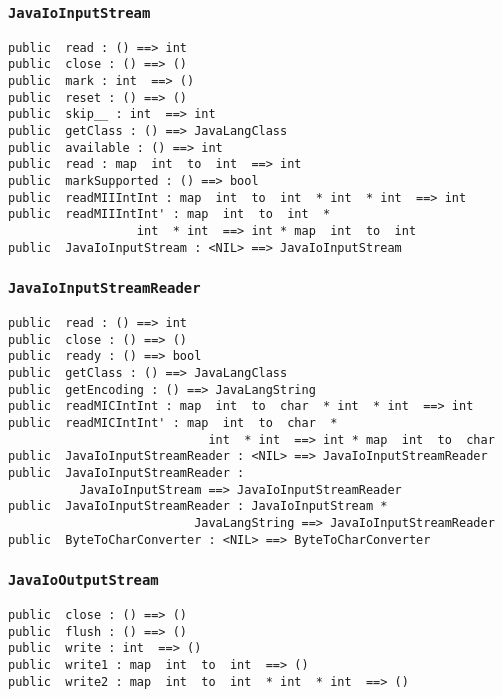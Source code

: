 \documentclass[\pformat,12pt]{article}
\begin{document}
\subsubsection{\texttt{JavaIoInputStream}}
\begin{small}
\begin{verbatim}
public  read : () ==> int
public  close : () ==> ()
public  mark : int  ==> ()
public  reset : () ==> ()
public  skip__ : int  ==> int
public  getClass : () ==> JavaLangClass
public  available : () ==> int
public  read : map  int  to  int  ==> int
public  markSupported : () ==> bool
public  readMIIIntInt : map  int  to  int  * int  * int  ==> int
public  readMIIIntInt' : map  int  to  int  * 
                  int  * int  ==> int * map  int  to  int
public  JavaIoInputStream : <NIL> ==> JavaIoInputStream
\end{verbatim}
\end{small}

\subsubsection{\texttt{JavaIoInputStreamReader}}
\begin{small}
\begin{verbatim}
public  read : () ==> int
public  close : () ==> ()
public  ready : () ==> bool
public  getClass : () ==> JavaLangClass
public  getEncoding : () ==> JavaLangString
public  readMICIntInt : map  int  to  char  * int  * int  ==> int
public  readMICIntInt' : map  int  to  char  * 
                            int  * int  ==> int * map  int  to  char
public  JavaIoInputStreamReader : <NIL> ==> JavaIoInputStreamReader
public  JavaIoInputStreamReader : 
          JavaIoInputStream ==> JavaIoInputStreamReader
public  JavaIoInputStreamReader : JavaIoInputStream * 
                          JavaLangString ==> JavaIoInputStreamReader
public  ByteToCharConverter : <NIL> ==> ByteToCharConverter
\end{verbatim}
\end{small}

\subsubsection{\texttt{JavaIoOutputStream}}
\begin{small}
\begin{verbatim}
public  close : () ==> ()
public  flush : () ==> ()
public  write : int  ==> ()
public  write1 : map  int  to  int  ==> ()
public  write2 : map  int  to  int  * int  * int  ==> ()
\end{verbatim}
\end{small}
\end{document}
